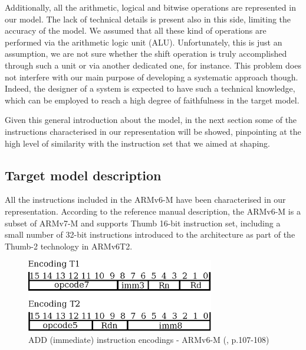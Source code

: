 \documentclass[conference]{IEEEtran}
\begin{document}
Additionally, all the arithmetic, logical and bitwise operations are represented in our
model. The lack of technical details is present also in this side, limiting the accuracy of
the model. We assumed that all these kind of operations are
performed via the arithmetic logic unit (ALU). Unfortunately, this is just an
assumption, we are not sure whether the shift operation is truly accomplished
through such a unit or via another dedicated one, for instance.
This problem does not interfere with our main purpose of
developing a systematic approach though. Indeed, the designer of a system is expected to have
such a technical knowledge, which can be employed to reach a high degree of faithfulness in
the target model.

Given this general introduction about the model, in the next section some of the instructions
characterised in our representation will be showed, pinpointing at the high level of
similarity with the instruction set that we aimed at shaping.

\subsection{Target model description}
All the instructions included in the ARMv6-M have been characterised in our representation.
According to the reference manual description, the ARMv6-M is a subset of ARMv7-M and
supports Thumb 16-bit instruction set, including a small number of 32-bit instructions
introduced to the architecture as part of the Thumb-2 technology in ARMv6T2. 

\begin{figure}[ht!]
\begin{center}
	\includegraphics[width=8.2cm]{IMG/encodings.eps}
	\caption{ADD (immediate) instruction encodings - ARMv6-M (\cite{armManual}, p.107-108)}
	\label{fig:ADDEnc}
\end{center}
\end{figure}
\end{document}

